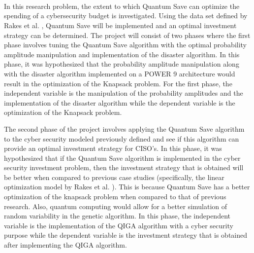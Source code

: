 \section*{\color{SectionBlue}{Experimental Design}} \label{sec:sections}
\subsection*{\color{SubSectionBlue}{Variables}}
 \\
In this research problem, the extent to which Quantum Save can optimize the spending of a cybersecurity budget is investigated. Using the data set defined by Rakes et al. \cite{rakes_it_2012}, Quantum Save will be implemented and an optimal investment strategy can be determined. The project will consist of two phases where the first phase involves tuning the Quantum Save algorithm with the optimal probability amplitude manipulation and implementation of the disaster algorithm. In this phase, it was hypothesized that the probability amplitude manipulation along with the disaster algorithm implemented on a POWER 9 architecture would result in the optimization of the Knapsack problem. For the first phase, the independent variable is the manipulation of the probability amplitudes and the implementation of the disaster algorithm while the dependent variable is the optimization of the Knapsack problem.

\vspace{1mm}

The second phase of the project involves applying the Quantum Save algorithm to the cyber security modeled previously defined and see if this algorithm can provide an optimal investment strategy for CISO’s. In this phase, it was hypothesized that if the Quantum Save algorithm is implemented in the cyber security investment problem, then the investment strategy that is obtained will be better when compared to previous case studies (specifically, the linear optimization model by Rakes et al. \cite{rakes_it_2012}). This is because Quantum Save has a better optimization of the knapsack problem when compared to that of previous research. Also, quantum computing would allow for a better simulation of random variability in the genetic algorithm. In this phase, the independent variable is the implementation of the QIGA algorithm with a cyber security purpose while the dependent variable is the investment strategy that is obtained after implementing the QIGA algorithm.

